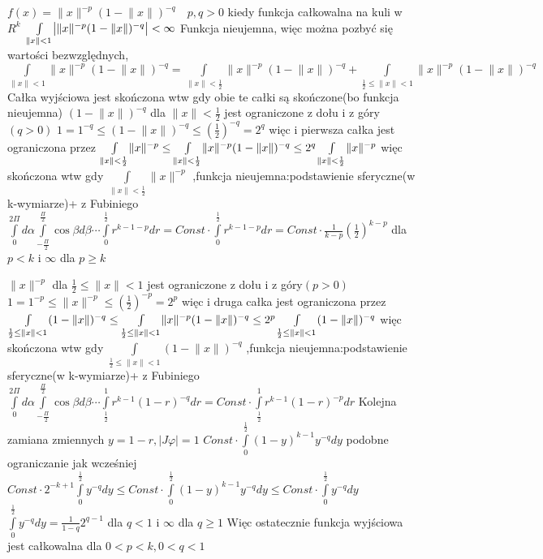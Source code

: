 \documentclass{article}
\begin{document}
$
f(x)=\lVert x\rVert^{-p}(1-\lVert x\rVert)^{-q}\quad p,q>0$ kiedy funkcja całkowalna na kuli w $R^k$
$\newline
\int\limits_{\lVert x\rVert<1}\bigl|\lVert x\rVert^{-p}(1-\lVert x\rVert)^{-q} \bigr|<\infty
$
 Funkcja nieujemna, więc można pozbyć się wartości bezwzględnych,
$
\int\limits_{\lVert x\rVert<1}\lVert x\rVert^{-p}(1-\lVert x\rVert)^{-q}
=
\int\limits_{\lVert x\rVert<\frac{1}{2}}\lVert x\rVert^{-p}(1-\lVert x\rVert)^{-q}
+
\int\limits_{\frac{1}{2}\le\lVert x\rVert<1}\lVert x\rVert^{-p}(1-\lVert x\rVert)^{-q}
$
Całka wyjściowa jest skończona wtw gdy obie te całki są skończone(bo funkcja nieujemna)
$(1-\lVert x\rVert)^{-q}$ dla $\lVert x\rVert<\frac{1}{2}$ jest ograniczone z dołu i z góry$(q>0)$\newline
$1=1^{-q}\le(1-\lVert x\rVert)^{-q}\le(\frac{1}{2})^{-q}=2^q$ więc i pierwsza całka jest ograniczona przez\newline
$
\int\limits_{\lVert x\rVert<\frac{1}{2}}\lVert x\rVert^{-p}\le
\int\limits_{\lVert x\rVert<\frac{1}{2}}\lVert x\rVert^{-p}(1-\lVert x\rVert)^{-q}
\le2^q\int\limits_{\lVert x\rVert<\frac{1}{2}}\lVert x\rVert^{-p}\newline
$ więc skończona wtw gdy $\int\limits_{\lVert x\rVert<\frac{1}{2}}\lVert x\rVert^{-p}$\newline
,funkcja nieujemna:podstawienie sferyczne(w k-wymiarze)+ z Fubiniego\newline
$
\int\limits_{0}^{2\Pi}d\alpha\int\limits_{-\frac{\Pi}{2}}^{\frac{\Pi}{2}}\cos{\beta}d\beta \cdots \int\limits_{0}^{\frac{1}{2}}r^{k-1-p}dr=
Const\cdot\int\limits_{0}^{\frac{1}{2}}r^{k-1-p}dr=Const\cdot\frac{1}{k-p}(\frac{1}{2})^{k-p}$ dla $p<k$ i $\infty$ dla $p\ge k$

$\lVert x\rVert^{-p}$ dla $\frac{1}{2}\le\lVert x\rVert<1$ jest ograniczone z dołu i z góry$(p>0)$\newline
$1=1^{-p}\le\lVert x\rVert^{-p}\le(\frac{1}{2})^{-p}=2^p$ więc i druga całka jest ograniczona przez\newline
$
\int\limits_{\frac{1}{2}\le\lVert x\rVert<1}(1-\lVert x\rVert)^{-q}\le
\int\limits_{\frac{1}{2}\le\lVert x\rVert<1}\lVert x\rVert^{-p}(1-\lVert x\rVert)^{-q}
\le2^p\int\limits_{\frac{1}{2}\le\lVert x\rVert<1}(1-\lVert x\rVert)^{-q}\newline
$ więc skończona wtw gdy $\int\limits_{\frac{1}{2}\le\lVert x\rVert<1}(1-\lVert x\rVert)^{-q}$\newline
,funkcja nieujemna:podstawienie sferyczne(w k-wymiarze)+ z Fubiniego\newline
$
\int\limits_{0}^{2\Pi}d\alpha\int\limits_{-\frac{\Pi}{2}}^{\frac{\Pi}{2}}\cos{\beta}d\beta \cdots \int\limits_{\frac{1}{2}}^{1}r^{k-1}(1-r)^{-q}dr=
Const\cdot\int\limits_{\frac{1}{2}}^{1}r^{k-1}(1-r)^{-p}dr
$
Kolejna zamiana zmiennych $y=1-r,|J\varphi|=1$\quad
$
Const\cdot\int\limits_{0}^{\frac{1}{2}}(1-y)^{k-1}y^{-q}dy
$ podobne ograniczanie jak wcześniej
$
Const\cdot2^{-k+1}\int\limits_{0}^{\frac{1}{2}}y^{-q}dy\le
Const\cdot\int\limits_{0}^{\frac{1}{2}}(1-y)^{k-1}y^{-q}dy
\le Const\cdot\int\limits_{0}^{\frac{1}{2}}y^{-q}dy\quad
$
$\int\limits_{0}^{\frac{1}{2}}y^{-q}dy=\frac{1}{1-q}2^{q-1}$ dla $q<1$ i $\infty$ dla $q\ge 1$\newline
Więc ostatecznie funkcja wyjściowa jest całkowalna dla $0<p<k,0<q<1$
\end{document}

